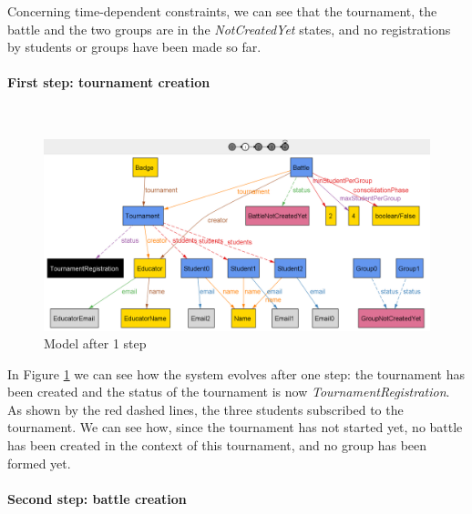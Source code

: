 Concerning time-dependent constraints, we can see that the tournament, the battle and the two groups are in the \textit{NotCreatedYet} states, and no registrations by students or groups have been made so far.

\newpage

\paragraph{First step: tournament creation}
\textbf{ }\\

\begin{figure}[h]
    \centering
    \includegraphics[scale=0.45]{Images/AlloyStep1.png}
    \caption{Model after 1 step}
    \label{fig:step1}
\end{figure}

In Figure \ref{fig:step1} we can see how the system evolves after one step: the tournament has been created and the status of the tournament is now \textit{TournamentRegistration}. As shown by the red dashed lines, the three students subscribed to the tournament. We can see how, since the tournament has not started yet, no battle has been created in the context of this tournament, and no group has been formed yet.

\newpage

\paragraph{Second step: battle creation}
\textbf{ }\\


